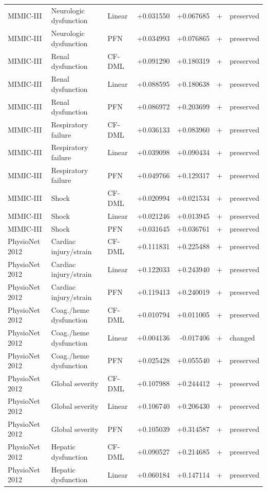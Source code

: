 \begin{longtable}{@{}p{0.78in}p{1.18in}p{0.56in}rrlp{0.62in}@{}}
MIMIC-III & Neurologic dysfunction & Linear & +0.031550 & +0.067685 & + & preserved\\
MIMIC-III & Neurologic dysfunction & PFN & +0.034993 & +0.076865 & + & preserved\\
MIMIC-III & Renal dysfunction & CF-DML & +0.091290 & +0.180319 & + & preserved\\
MIMIC-III & Renal dysfunction & Linear & +0.088595 & +0.180638 & + & preserved\\
MIMIC-III & Renal dysfunction & PFN & +0.086972 & +0.203699 & + & preserved\\
MIMIC-III & Respiratory failure & CF-DML & +0.036133 & +0.083960 & + & preserved\\
MIMIC-III & Respiratory failure & Linear & +0.039098 & +0.090434 & + & preserved\\
MIMIC-III & Respiratory failure & PFN & +0.049766 & +0.129317 & + & preserved\\
MIMIC-III & Shock & CF-DML & +0.020994 & +0.021534 & + & preserved\\
MIMIC-III & Shock & Linear & +0.021246 & +0.013945 & + & preserved\\
MIMIC-III & Shock & PFN & +0.031645 & +0.036761 & + & preserved\\
PhysioNet 2012 & Cardiac injury/strain & CF-DML & +0.111831 & +0.225488 & + & preserved\\
PhysioNet 2012 & Cardiac injury/strain & Linear & +0.122033 & +0.243940 & + & preserved\\
PhysioNet 2012 & Cardiac injury/strain & PFN & +0.119413 & +0.240019 & + & preserved\\
PhysioNet 2012 & Coag./heme dysfunction & CF-DML & +0.010794 & +0.011005 & + & preserved\\
PhysioNet 2012 & Coag./heme dysfunction & Linear & +0.004136 & -0.017406 & + & changed\\
PhysioNet 2012 & Coag./heme dysfunction & PFN & +0.025428 & +0.055540 & + & preserved\\
PhysioNet 2012 & Global severity & CF-DML & +0.107988 & +0.244412 & + & preserved\\
PhysioNet 2012 & Global severity & Linear & +0.106740 & +0.206430 & + & preserved\\
PhysioNet 2012 & Global severity & PFN & +0.105039 & +0.314587 & + & preserved\\
PhysioNet 2012 & Hepatic dysfunction & CF-DML & +0.090527 & +0.214685 & + & preserved\\
PhysioNet 2012 & Hepatic dysfunction & Linear & +0.060184 & +0.147114 & + & preserved\\

\end{longtable}
